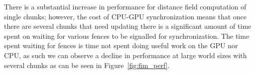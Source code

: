 \begin{table}[h]
    \centering
    \vspace{0.5em}
    \caption{Distance field compute shader execution time (as a total of all iterations required to achieve convergence)
        using the FIM algorithm.}
    \label{tab:fim_chunks}
\end{table}

There is a substantial increase in performance for distance field computation of single chunks; however, the cost of
CPU-GPU synchronization means that once there are several chunks that need updating there is a significant amount of
time spent on waiting for various fences to be signalled for synchronization. The time spent waiting for fences is time
not spent doing useful work on the GPU nor CPU, as such we can observe a decline in performance at large world sizes
with several chunks as can be seen in Figure~\ref{fig:fim_perf}.

